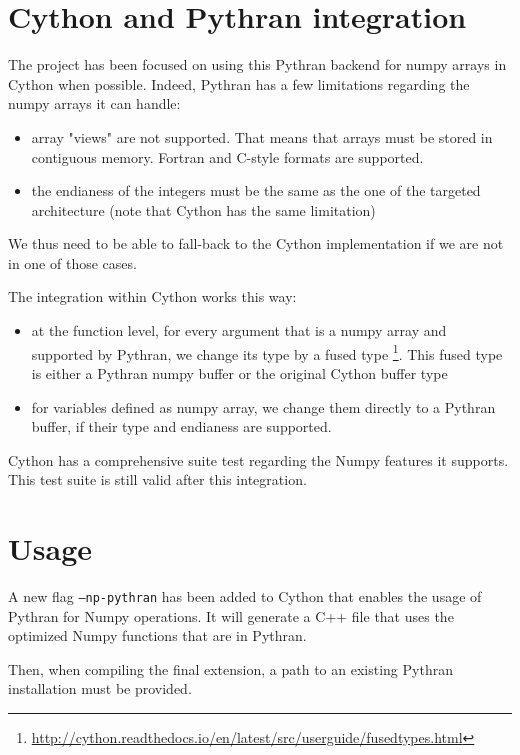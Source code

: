 \documentclass{deliverablereport}
\begin{document}
\section{Cython and Pythran integration}

The project has been focused on using this Pythran backend for numpy arrays in
Cython when possible. Indeed, Pythran has a few limitations regarding the numpy
arrays it can handle:

\begin{itemize}
  \item array "views" are not supported. That means that arrays must be stored
    in contiguous memory. Fortran and C-style formats are supported.
  \item the endianess of the integers must be the same as the one of the
    targeted architecture (note that Cython has the same limitation)
\end{itemize}

We thus need to be able to fall-back to the Cython implementation if we are not
in one of those cases.

The integration within Cython works this way:

\begin{itemize}
  \item at the function level, for every argument that is a numpy array and
    supported by Pythran, we change its type by a fused type
    \footnote{\url{http://cython.readthedocs.io/en/latest/src/userguide/fusedtypes.html}}.
    This fused type is either a Pythran numpy buffer or the original Cython
    buffer type
  \item for variables defined as numpy array, we change them directly to a
    Pythran buffer, if their type and endianess are supported.
\end{itemize}

Cython has a comprehensive suite test regarding the Numpy features it supports.
This test suite is still valid after this integration.

\section{Usage}

A new flag {\tt --np-pythran} has been added to Cython that enables the usage
of Pythran for Numpy operations. It will generate a C++ file that uses the
optimized Numpy functions that are in Pythran.

Then, when compiling the final extension, a path to an existing Pythran
installation must be provided.
\end{document}
